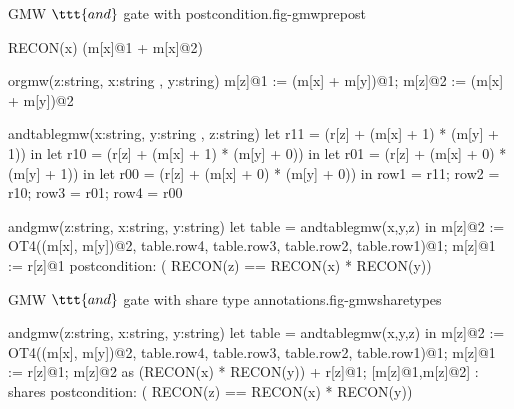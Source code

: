 \begin{fpfig}[t]{GMW $\ttt{and}$ gate with postcondition.}{fig-gmwprepost}
{\footnotesize
\begin{verbatimtab}
RECON(x) { (m[x]@1 + m[x]@2) }

orgmw(z:string, x:string , y:string) {
  m[z]@1 := (m[x] + m[y])@1;
  m[z]@2 := (m[x] + m[y])@2
}

andtablegmw(x:string, y:string , z:string) {
  let r11 = (r[z] + (m[x] + 1) * (m[y] + 1)) in
  let r10 = (r[z] + (m[x] + 1) * (m[y] + 0)) in
  let r01 = (r[z] + (m[x] + 0) * (m[y] + 1)) in
  let r00 = (r[z] + (m[x] + 0) * (m[y] + 0)) in
  { row1 = r11; row2 = r10; row3 = r01; row4 = r00 }
}

andgmw(z:string, x:string, y:string) {
  let table = andtablegmw(x,y,z) in
  m[z]@2 := OT4((m[x], m[y])@2, table.row4, table.row3, table.row2, table.row1)@1;
  m[z]@1 := r[z]@1
}
postcondition:  ( RECON(z) == RECON(x) * RECON(y))
\end{verbatimtab}}
\end{fpfig}

\begin{fpfig}[t]{GMW $\ttt{and}$ gate with share type annotations.}{fig-gmwsharetypes}
\begin{verbatimtab}
andgmw(z:string, x:string, y:string) {
  let table = andtablegmw(x,y,z) in
  m[z]@2 := OT4((m[x], m[y])@2, table.row4, table.row3, table.row2, table.row1)@1;
  m[z]@1 := r[z]@1;
  m[z]@2 as (RECON(x) * RECON(y)) + r[z]@1;
  [m[z]@1,m[z]@2] : shares
}
postcondition:  ( RECON(z) == RECON(x) * RECON(y))
\end{verbatimtab}
\end{fpfig}
